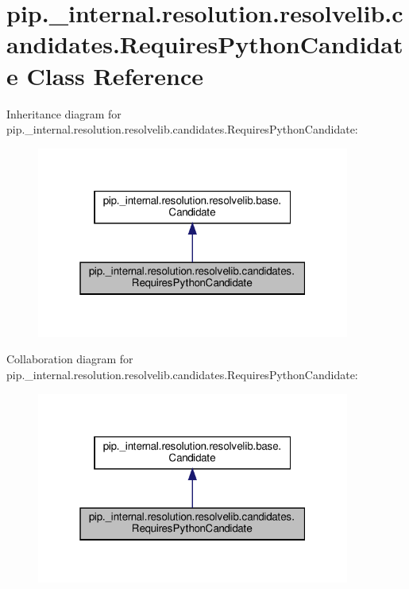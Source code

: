 \hypertarget{classpip_1_1__internal_1_1resolution_1_1resolvelib_1_1candidates_1_1RequiresPythonCandidate}{}\section{pip.\+\_\+internal.\+resolution.\+resolvelib.\+candidates.\+Requires\+Python\+Candidate Class Reference}
\label{classpip_1_1__internal_1_1resolution_1_1resolvelib_1_1candidates_1_1RequiresPythonCandidate}


Inheritance diagram for pip.\+\_\+internal.\+resolution.\+resolvelib.\+candidates.\+Requires\+Python\+Candidate\+:
\nopagebreak
\begin{figure}[H]
\begin{center}
\leavevmode
\includegraphics[width=292pt]{classpip_1_1__internal_1_1resolution_1_1resolvelib_1_1candidates_1_1RequiresPythonCandidate__inherit__graph}
\end{center}
\end{figure}


Collaboration diagram for pip.\+\_\+internal.\+resolution.\+resolvelib.\+candidates.\+Requires\+Python\+Candidate\+:
\nopagebreak
\begin{figure}[H]
\begin{center}
\leavevmode
\includegraphics[width=292pt]{classpip_1_1__internal_1_1resolution_1_1resolvelib_1_1candidates_1_1RequiresPythonCandidate__coll__graph}
\end{center}
\end{figure}
